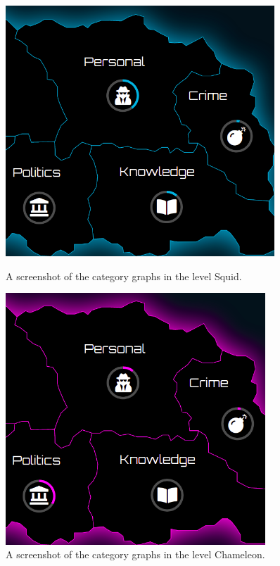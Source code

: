 \begin{figure}[ht!]
    \begin{minipage}[b][][b]{0.46\textwidth}
    \centering
    \includegraphics[width=0.9\textwidth]{graphics/game/city_category.png}
    \caption{A screenshot of the category graphs in the level Squid.}
    \label{fig:category1}
    \end{minipage}
    \hfill
    \begin{minipage}[b][][b]{0.46\textwidth}
    \centering
    \includegraphics[width=0.87\textwidth]{graphics/game/city_category_2.png}
    \caption{A screenshot of the category graphs in the level Chameleon.}
    \label{fig:category2}
    \end{minipage}
\end{figure}

